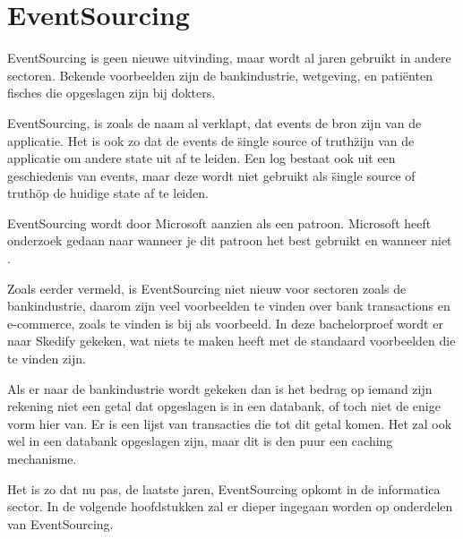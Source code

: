 
\chapter{EventSourcing}
\label{ch:eventsourcing}

EventSourcing is geen nieuwe uitvinding, maar wordt al jaren gebruikt in andere sectoren. Bekende voorbeelden zijn de bankindustrie, wetgeving, en patiënten fisches die opgeslagen zijn bij dokters.

EventSourcing, is zoals de naam al verklapt, dat events de bron zijn van de applicatie. Het is ook zo dat de events de \"single source of truth\" zijn van de applicatie om andere state uit af te leiden. Een log bestaat ook uit een geschiedenis van events, maar deze wordt niet gebruikt als \"single source of truth\" op de huidige state af te leiden.

EventSourcing wordt door Microsoft aanzien als een patroon. Microsoft heeft onderzoek gedaan naar wanneer je dit patroon het best gebruikt en wanneer niet \autocite{Microsoft2017ES}.

Zoals eerder vermeld, is EventSourcing niet nieuw voor sectoren zoals de bankindustrie, daarom zijn veel voorbeelden te vinden over bank transactions en e-commerce, zoals te vinden is bij \textcite{Microsoft2017ES} als voorbeeld. In deze bachelorproef wordt er naar Skedify gekeken, wat niets te maken heeft met de standaard voorbeelden die te vinden zijn.

Als er naar de bankindustrie wordt gekeken dan is het bedrag op iemand zijn rekening niet een getal dat opgeslagen is in een databank, of toch niet de enige vorm hier van. Er is een lijst van transacties die tot dit getal komen. Het zal ook wel in een databank opgeslagen zijn, maar dit is den puur een caching mechanisme.

Het is zo dat nu pas, de laatste jaren, EventSourcing opkomt in de informatica sector. In de volgende hoofdstukken zal er dieper ingegaan worden op onderdelen van EventSourcing.